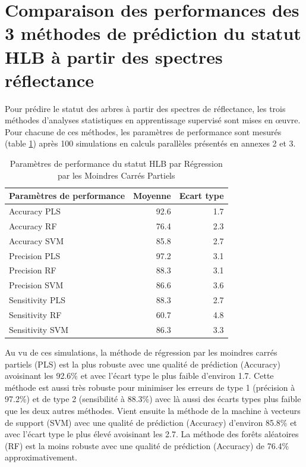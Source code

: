 \documentclass[
  11pt,
  french,
  a4paper,
  extrafontsizes,onecolumn,openright
  ]{memoir}
\begin{document}
\vfill
\newpage

\hypertarget{comparaison-des-performances-des-3-muxe9thodes-de-pruxe9diction-du-statut-hlb-uxe0-partir-des-spectres-ruxe9flectance}{%
\section{Comparaison des performances des 3 méthodes de prédiction du statut HLB à partir des spectres réflectance}\label{comparaison-des-performances-des-3-muxe9thodes-de-pruxe9diction-du-statut-hlb-uxe0-partir-des-spectres-ruxe9flectance}}

Pour prédire le statut des arbres à partir des spectres de réflectance, les trois méthodes d'analyses statistiques en apprentissage supervisé sont mises en œuvre. Pour chacune de ces méthodes, les paramètres de performance sont mesurés (table \ref{tab:T2}) après 100 simulations en calculs parallèles présentés en annexes 2 et 3.

\scriptsize

\begin{longtable}[t]{lrr}
\caption{\label{tab:T2}Paramètres de performance du statut HLB par Régression par les Moindres Carrés Partiels}\\
\toprule
Paramètres de performance & Moyenne & Ecart type\\
\midrule
Accuracy PLS & 92.6 & 1.7\\
Accuracy RF & 76.4 & 2.3\\
Accuracy SVM & 85.8 & 2.7\\
Precision PLS & 97.2 & 3.1\\
Precision RF & 88.3 & 3.1\\
\addlinespace
Precision SVM & 86.6 & 3.6\\
Sensitivity PLS & 88.3 & 2.7\\
Sensitivity RF & 60.7 & 4.8\\
Sensitivity SVM & 86.3 & 3.3\\
\bottomrule
\end{longtable}

\normalsize

Au vu de ces simulations, la méthode de régression par les moindres carrés partiels (PLS) est la plus robuste avec une qualité de prédiction (Accuracy) avoisinant les 92.6\% et avec l'écart type le plus faible d'environ 1.7.
Cette méthode est aussi très robuste pour minimiser les erreurs de type 1 (précision à 97.2\%) et de type 2 (sensibilité à 88.3\%) avec là aussi des écarts types plus faible que les deux autres méthodes.
Vient ensuite la méthode de la machine à vecteurs de support (SVM) avec une qualité de prédiction (Accuracy) d'environ 85.8\% et avec l'écart type le plus élevé avoisinant les 2.7. La méthode des forêts aléatoires (RF) est la moins robuste avec une qualité de prédiction (Accuracy) de 76.4\% approximativement.
\end{document}

